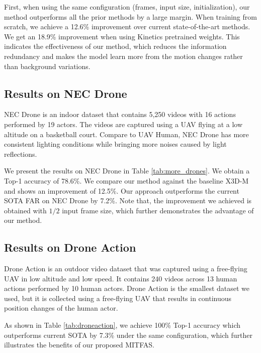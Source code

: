 \documentclass[10pt,twocolumn,letterpaper]{article}
\begin{document}
{First, when using the same configuration (frames, input size, initialization), our method outperforms all the prior methods by a large margin. When training from scratch, we achieve a 12.6\% improvement over current state-of-the-art methods. We get an 18.9\% improvement when using Kinetics pretrained weights. This indicates the effectiveness of our method, which reduces the information redundancy and makes the model learn more from the motion changes rather than background variations.







\subsection{Results on NEC Drone}
NEC Drone is an indoor dataset that contains 5,250 videos with 16 actions performed by 19 actors. The videos are captured using a UAV flying at a low altitude on a basketball court. Compare to UAV Human, NEC Drone has more consistent lighting conditions while bringing more noises caused by light reflections.

We present the results on NEC Drone in Table \ref{tab:more_drones}. We obtain a Top-1 accuracy of 78.6\%. We compare our method against the baseline X3D-M and shows an improvement of 12.5\%. Our approach outperforms the current SOTA FAR on NEC Drone by 7.2\%. Note that, the improvement we achieved is obtained with $1/2$ input frame size, which further demonstrates the advantage of our method.
\subsection{Results on Drone Action}
Drone Action is an outdoor video dataset that was captured using a free-flying UAV in low altitude and low speed. It contains 240 videos across 13 human actions performed by 10 human actors. Drone Action is the smallest dataset we used, but it is collected using a free-flying UAV that results in continuous position changes of the human actor. 

As shown in Table \ref{tab:droneaction}, we achieve 100\% Top-1 accuracy which outperforms current SOTA by 7.3\% under the same configuration, which further illustrates the benefits of our proposed MITFAS.

}
\end{document}
